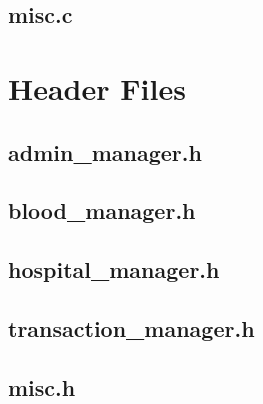\documentclass[12pt,a4paper]{report}
\begin{document}
\subsection{misc.c}


\section{Header Files}
\subsection{admin\_manager.h}


\subsection{blood\_manager.h}


\subsection{hospital\_manager.h}


\subsection{transaction\_manager.h}


\subsection{misc.h}

\end{document}
